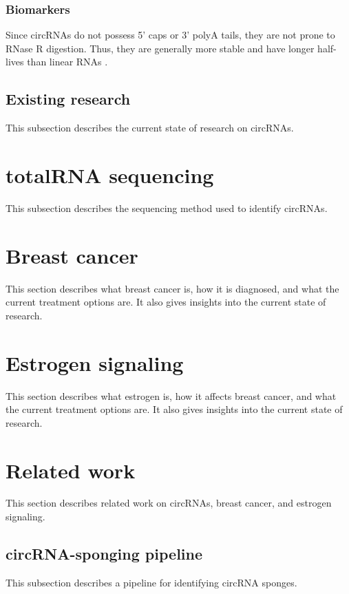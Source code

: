 \subsubsection{Biomarkers}
Since circRNAs do not possess 5' caps or 3' polyA tails, they are not prone to RNase R digestion.
Thus, they are generally more stable and have longer half-lives than linear RNAs \supercite{kristensen_biogenesis_2019}.

\subsection{Existing research}
This subsection describes the current state of research on circRNAs.

\section{totalRNA sequencing}
This subsection describes the sequencing method used to identify circRNAs.

\lipsum[2]

\section{Breast cancer}
This section describes what breast cancer is, how it is diagnosed, and what the current treatment options are.
It also gives insights into the current state of research.

\lipsum[3]

\section{Estrogen signaling}
This section describes what estrogen is, how it affects breast cancer, and what the current treatment options are.
It also gives insights into the current state of research.

\lipsum[4]

\section{Related work}
This section describes related work on circRNAs, breast cancer, and estrogen signaling.

\subsection{circRNA-sponging pipeline}
This subsection describes a pipeline for identifying circRNA sponges.